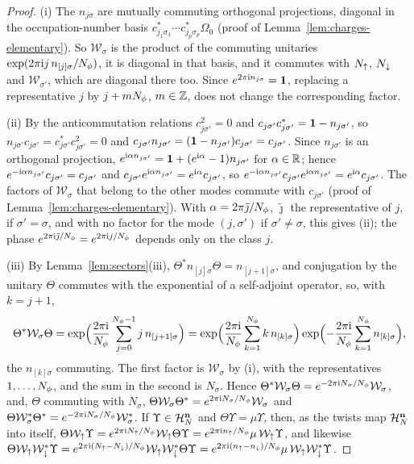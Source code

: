 \begin{proof}
(i) The $n_{j\sigma}$ are mutually commuting orthogonal projections, diagonal in the occupation-number basis
$c^*_{j_1\sigma_1}\cdots c^*_{j_p\sigma_p}\Omega_0$ (proof of Lemma~\ref{lem:charges-elementary}). So $\mathcal W_\sigma$ is the
product of the commuting unitaries $\exp(2\pi\mathrm{i} j\,n_{[j]\sigma}/N_{\phi})$, it is diagonal in that basis, and it commutes with
$N_{\uparrow}$, $N_{\downarrow}$ and $\mathcal W_{\sigma'}$, which are diagonal there too. Since $e^{2\pi\mathrm{i} n_{j\sigma}}=\mathbf{1}$, replacing a
representative $j$ by $j+mN_{\phi}$, $m\in\mathbb{Z}$, does not change the corresponding factor.

(ii) By the anticommutation relations $c_{j\sigma'}^2=0$ and $c_{j\sigma'}c_{j\sigma'}^*=\mathbf{1}-n_{j\sigma'}$, so
$n_{j\sigma'}c_{j\sigma'}=c_{j\sigma'}^*c_{j\sigma'}^2=0$ and $c_{j\sigma'}n_{j\sigma'}=(\mathbf{1}-n_{j\sigma'})c_{j\sigma'}=c_{j\sigma'}$. Since
$n_{j\sigma'}$ is an orthogonal projection, $e^{\mathrm{i}\alpha n_{j\sigma'}}=\mathbf{1}+(e^{\mathrm{i}\alpha}-1)n_{j\sigma'}$ for $\alpha\in\mathbb{R}$; hence
$e^{-\mathrm{i}\alpha n_{j\sigma'}}c_{j\sigma'}=c_{j\sigma'}$ and $c_{j\sigma'}e^{\mathrm{i}\alpha n_{j\sigma'}}=e^{\mathrm{i}\alpha}c_{j\sigma'}$, so
$e^{-\mathrm{i}\alpha n_{j\sigma'}}c_{j\sigma'}e^{\mathrm{i}\alpha n_{j\sigma'}}=e^{\mathrm{i}\alpha}c_{j\sigma'}$. The factors of $\mathcal W_\sigma$ that belong to
the other modes commute with $c_{j\sigma'}$ (proof of Lemma~\ref{lem:charges-elementary}). With
$\alpha=2\pi\tilde\jmath/N_{\phi}$, $\tilde\jmath$ the representative of $j$, if $\sigma'=\sigma$, and with no factor for the mode
$(j,\sigma')$ if $\sigma'\ne\sigma$, this gives (ii); the phase $e^{2\pi\mathrm{i}\tilde\jmath/N_{\phi}}=e^{2\pi\mathrm{i} j/N_{\phi}}$ depends
only on the class $j$.

(iii) By Lemma~\ref{lem:sectors}(iii), $\Theta^*n_{[j]\sigma}\Theta=n_{[j+1]\sigma}$, and conjugation by the unitary $\Theta$
commutes with the exponential of a self-adjoint operator, so, with $k=j+1$,
\[
\Theta^*\mathcal W_\sigma\Theta=\exp\Bigl(\frac{2\pi\mathrm{i}}{N_{\phi}}\sum_{j=0}^{N_{\phi}-1}j\,n_{[j+1]\sigma}\Bigr)
=\exp\Bigl(\frac{2\pi\mathrm{i}}{N_{\phi}}\sum_{k=1}^{N_{\phi}}k\,n_{[k]\sigma}\Bigr)\exp\Bigl(-\frac{2\pi\mathrm{i}}{N_{\phi}}\sum_{k=1}^{N_{\phi}}n_{[k]\sigma}\Bigr),
\]
the $n_{[k]\sigma}$ commuting. The first factor is $\mathcal W_\sigma$ by (i), with the representatives $1,\dots,N_{\phi}$, and
the sum in the second is $N_\sigma$. Hence $\Theta^*\mathcal W_\sigma\Theta=e^{-2\pi\mathrm{i} N_\sigma/N_{\phi}}\mathcal W_\sigma$, and,
$\Theta$ commuting with $N_\sigma$, $\Theta\mathcal W_\sigma\Theta^*=e^{2\pi\mathrm{i} N_\sigma/N_{\phi}}\mathcal W_\sigma$ and
$\Theta\mathcal W_\sigma^*\Theta^*=e^{-2\pi\mathrm{i} N_\sigma/N_{\phi}}\mathcal W_\sigma^*$. If $\Upsilon\in\mathcal{H}_N^{\mathbf{n}}$ and $\Theta\Upsilon=\mu\Upsilon$,
then, as the twists map $\mathcal{H}_N^{\mathbf{n}}$ into itself, $\Theta\mathcal W_{\uparrow}\Upsilon=e^{2\pi\mathrm{i} N_{\uparrow}/N_{\phi}}\mathcal W_{\uparrow}\Theta\Upsilon
=e^{2\pi\mathrm{i} n_{\uparrow}/N_{\phi}}\mu\,\mathcal W_{\uparrow}\Upsilon$, and likewise
$\Theta\mathcal W_{\uparrow}\mathcal W_{\downarrow}^*\Upsilon=e^{2\pi\mathrm{i}(N_{\uparrow}-N_{\downarrow})/N_{\phi}}\mathcal W_{\uparrow}\mathcal W_{\downarrow}^*\Theta\Upsilon
=e^{2\pi\mathrm{i}(n_{\uparrow}-n_{\downarrow})/N_{\phi}}\mu\,\mathcal W_{\uparrow}\mathcal W_{\downarrow}^*\Upsilon$.


\end{proof}
